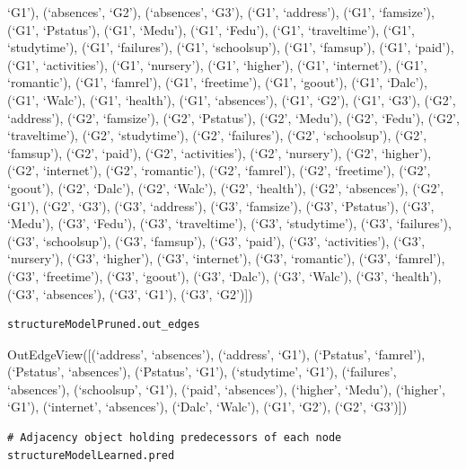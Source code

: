\documentclass[
]{article}
\begin{document}
`G1'), (`absences', `G2'), (`absences', `G3'), (`G1', `address'), (`G1',
`famsize'), (`G1', `Pstatus'), (`G1', `Medu'), (`G1', `Fedu'), (`G1',
`traveltime'), (`G1', `studytime'), (`G1', `failures'), (`G1',
`schoolsup'), (`G1', `famsup'), (`G1', `paid'), (`G1', `activities'),
(`G1', `nursery'), (`G1', `higher'), (`G1', `internet'), (`G1',
`romantic'), (`G1', `famrel'), (`G1', `freetime'), (`G1', `goout'),
(`G1', `Dalc'), (`G1', `Walc'), (`G1', `health'), (`G1', `absences'),
(`G1', `G2'), (`G1', `G3'), (`G2', `address'), (`G2', `famsize'), (`G2',
`Pstatus'), (`G2', `Medu'), (`G2', `Fedu'), (`G2', `traveltime'), (`G2',
`studytime'), (`G2', `failures'), (`G2', `schoolsup'), (`G2', `famsup'),
(`G2', `paid'), (`G2', `activities'), (`G2', `nursery'), (`G2',
`higher'), (`G2', `internet'), (`G2', `romantic'), (`G2', `famrel'),
(`G2', `freetime'), (`G2', `goout'), (`G2', `Dalc'), (`G2', `Walc'),
(`G2', `health'), (`G2', `absences'), (`G2', `G1'), (`G2', `G3'), (`G3',
`address'), (`G3', `famsize'), (`G3', `Pstatus'), (`G3', `Medu'), (`G3',
`Fedu'), (`G3', `traveltime'), (`G3', `studytime'), (`G3', `failures'),
(`G3', `schoolsup'), (`G3', `famsup'), (`G3', `paid'), (`G3',
`activities'), (`G3', `nursery'), (`G3', `higher'), (`G3', `internet'),
(`G3', `romantic'), (`G3', `famrel'), (`G3', `freetime'), (`G3',
`goout'), (`G3', `Dalc'), (`G3', `Walc'), (`G3', `health'), (`G3',
`absences'), (`G3', `G1'), (`G3', `G2'){]})

\begin{verbatim}
structureModelPruned.out_edges
\end{verbatim}

OutEdgeView({[}(`address', `absences'), (`address', `G1'), (`Pstatus',
`famrel'), (`Pstatus', `absences'), (`Pstatus', `G1'), (`studytime',
`G1'), (`failures', `absences'), (`schoolsup', `G1'), (`paid',
`absences'), (`higher', `Medu'), (`higher', `G1'), (`internet',
`absences'), (`Dalc', `Walc'), (`G1', `G2'), (`G2', `G3'){]})

\begin{verbatim}
# Adjacency object holding predecessors of each node
structureModelLearned.pred
\end{verbatim}
\end{document}

